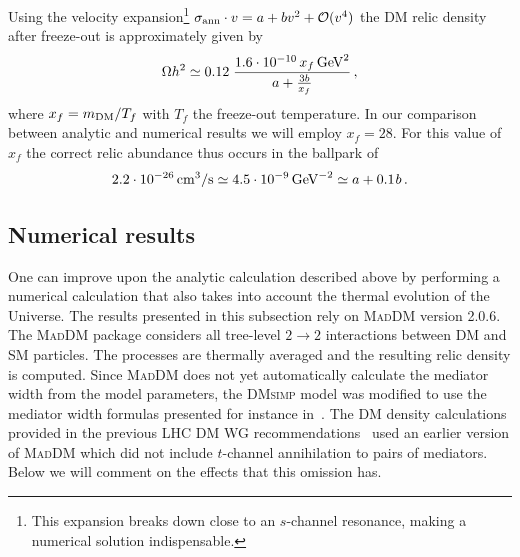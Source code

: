 \documentclass[review]{elsarticle}
\newcommand{\dmsimp}{\textsc{DMsimp}\xspace}
\newcommand{\maddm}{\textsc{MadDM}\xspace}
\begin{document}
Using the velocity expansion\footnote{This expansion breaks down close to an $s$-channel resonance, 
making a numerical solution indispensable.}  $\sigma_{\rm ann} \cdot v = a + b v^2 + {\cal O} (v^4)$ the DM relic density  after freeze-out is approximately given by
\begin{equation}
    \Omega h^2 \simeq 0.12 \; \frac{1.6 \cdot 10^{-10} \, x_f \, {\rm GeV}^2}{a + \frac{3b}{x_f}} \,,
\end{equation}
where $x_f = m_{\rm DM}/T_f$ with $T_f$ the freeze-out temperature. In our comparison between analytic and numerical results we will employ $x_f = 28$. For this value of $x_f$ the correct relic abundance thus occurs in the ballpark of
\begin{equation}
2.2 \cdot 10^{-26} \, {\rm cm}^3/{\rm s} \simeq 4.5 \cdot 10^{-9} \, {\rm GeV}^{-2} \simeq a + 0.1 \hspace{0.25mm} b \,.
\end{equation}

\subsection{Numerical results}
\label{numericrelic}

One can improve upon the analytic calculation described above by performing a numerical calculation 
that also takes into account the thermal evolution of the Universe. The results presented in this subsection rely on \maddm version 2.0.6.  The \maddm package considers all tree-level $2\rightarrow2$ interactions between DM and SM particles. The processes are thermally averaged and the resulting relic density is computed.
Since \maddm does not yet automatically calculate the mediator width from the model parameters, the \dmsimp model was modified to use the mediator width formulas presented for instance in~\cite{Abercrombie:2015wmb,Boveia:2016mrp}. 
The DM density calculations provided in the previous LHC DM WG recommendations~\cite{Boveia:2016mrp} 
used an earlier version of \maddm which did not include  $t$-channel annihilation to pairs of mediators. Below we will comment on the effects that this omission has.  
\end{document}
